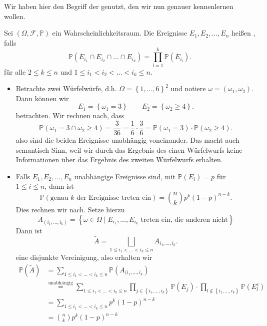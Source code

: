 \begin{remark}
Wir haben hier den Begriff der  genutzt, den wir nun genauer kennenlernen wollen.
\end{remark}
\begin{definition}
    Sei $(\Omega, \mathcal{F}, \mathbb{P})$ ein Wahrscheinlichkeitsraum. Die Ereignisse $E_1,E_2,\ldots,E_n$ heißen , falls
    \[
        \mathbb{P}(E_{i_1} \cap E_{i_2} \cap \ldots \cap E_{i_k}) = \prod_{l=1}^k \mathbb{P}(E_{i_l})
    .\] 
    für alle $2\leq k\leq n$ und $1\leq i_1<i_2 < \ldots < i_k \leq n$.
\end{definition}

\begin{example}
    \begin{itemize}
        \item 
    Betrachte zwei Würfelwürfe, d.h. $\Omega = \left \{1,\ldots,6\right\} ^2$ und notiere $\omega = (\omega_1,\omega_2)$. Dann können wir
    \[
    E_1 = \left \{\omega_1 = 3\right\}  \qquad E_2 = \left \{\omega_2 \geq  4\right\} 
    .\] 
    betrachten. Wir rechnen nach, dass
    \[
        \mathbb{P}(\omega_1 = 3 \cap \omega_2 \geq  4 ) = \frac{3}{36} = \frac{1}{6}\cdot \frac{3}{6} = \mathbb{P}(\omega_1 = 3) \cdot \mathbb{P}(\omega_2 \geq  4)
    .\] 
    also sind die beiden Ereignisse unabhängig voneinander. Das macht auch semantisch Sinn, weil wir durch das Ergebnis des einen Würfelwurfs keine Informationen über das Ergebnis des zweiten Würfelwurfs erhalten.
\item

Falls $E_1,E_2,\ldots,E_n$ unabhängige Ereignisse sind, mit $\mathbb{P}(E_i) = p$ für $1\leq i\leq n$, dann ist
\[
    \mathbb{P}(\text{genau $k$ der Ereignisse treten ein}) = \binom{n}{k} p^k (1-p)^{n-k}
.\] 
Dies rechnen wir nach. Setze hierzu 
\[
    A_{(i_1,\ldots,i_k)} = \left \{\omega\in \Omega \mid  E_{i_1},\ldots,E_{i_k} \text{ treten ein, die anderen nicht}\right\}
\]
Dann ist
\[
\tilde{A} = \bigsqcup_{1\leq i_1<\ldots<i_k \leq n} A_{i_1,\ldots,i_k}
.\] 
eine disjunkte Vereinigung, also erhalten wir
\begin{equation}
    \begin{split}
        \mathbb{P}(\tilde{A})                                 &= \sum_{1\leq i_1<\ldots<i_k\leq n} \mathbb{P}(A_{(i_1,\ldots,i_k}) \\
                                                              &\stackrel{\text{unabhängig}}{=} \sum_{1\leq i_1<\ldots<i_k \leq n} \prod_{j\in \left \{i_1,\ldots,i_k\right\} } \mathbb{P}(E_j) \cdot \prod_{l \not\in \left \{i_1,\ldots,i_k\right\} } \mathbb{P}(E_l^{c}) \\
                                                              &= \sum_{1\leq i_1<\ldots<i_k \leq n} p^k(1-p)^{n-k} \\
                                                              &= \binom{n}{k} p^k (1-p)^{n-k}
    \end{split}
\end{equation}
    \end{itemize}
\end{example}
